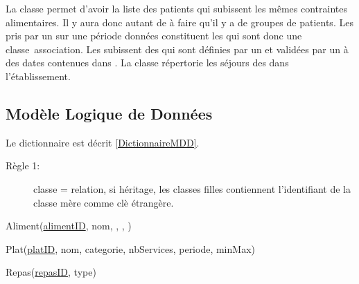 La classe  permet d'avoir la liste des patients qui subissent les mêmes contraintes alimentaires. Il y aura donc autant de  à faire qu'il y a de groupes de patients. Les  pris par un  sur une période données constituent les  qui sont donc une classe~association.
Les  subissent des  qui sont définies par un  et validées par un  à des dates contenues dans . La classe  répertorie les séjours des  dans l'établissement.


\subsection{Modèle Logique de Données}
Le dictionnaire est décrit \autoref{DictionnaireMDD}.
\begin{description}
\item[Règle 1:] classe = relation, si héritage, les classes filles contiennent l'identifiant de la classe mère comme clè étrangère.
\end{description}

Aliment(\underline{alimentID}, nom, , , )


Plat(\underline{platID}, nom, categorie, nbServices, periode, minMax)


Repas(\underline{repasID}, type)

